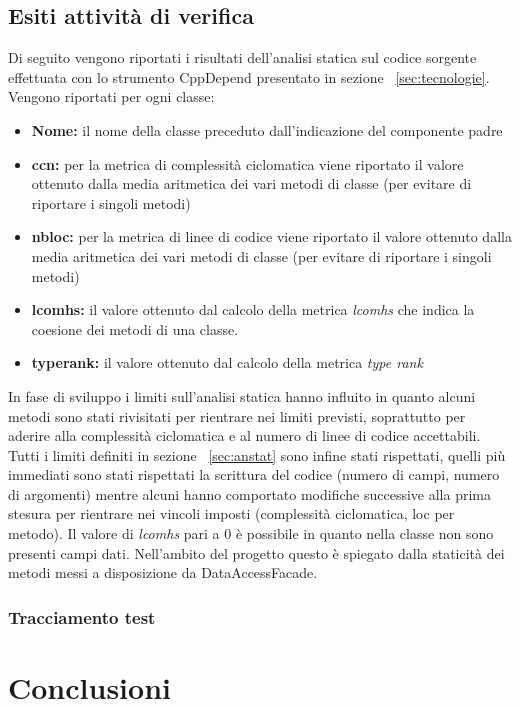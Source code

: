 \documentclass[a4paper,13pt,twoside]{article}
\begin{document}
\subsection{Esiti attività di verifica} \label{sec:esiti}
Di seguito vengono riportati i risultati dell'analisi statica sul codice sorgente effettuata con lo strumento CppDepend presentato in sezione ~\ref{sec:tecnologie}. Vengono riportati per ogni classe:
\begin{itemize}
	\item \textbf{Nome: } il nome della classe preceduto dall'indicazione del componente padre
	\item \textbf{ccn: } per la metrica di complessità ciclomatica viene riportato il valore ottenuto dalla media aritmetica dei vari metodi di classe (per evitare di riportare i singoli metodi)
	\item \textbf{nbloc: } per la metrica di linee di codice viene riportato il valore ottenuto dalla media aritmetica dei vari metodi di classe (per evitare di riportare i singoli metodi)
	\item \textbf{lcomhs: } il valore ottenuto dal calcolo della metrica \textit{lcomhs} che indica la coesione dei metodi di una classe.
	\item \textbf{typerank: } il valore ottenuto dal calcolo della metrica \textit{type rank}
\end{itemize}
In fase di sviluppo i limiti sull'analisi statica hanno influito in quanto alcuni metodi sono stati rivisitati per rientrare nei limiti previsti, soprattutto per aderire alla complessità ciclomatica e al numero di linee di codice accettabili. Tutti i limiti definiti in sezione ~\ref{sec:anstat} sono infine stati rispettati, quelli più immediati sono stati rispettati la scrittura del codice (numero di campi, numero di argomenti) mentre alcuni hanno comportato modifiche successive alla prima stesura per rientrare nei vincoli imposti (complessità ciclomatica, loc per metodo). Il valore di \textit{lcomhs} pari a 0 è possibile in quanto nella classe non sono presenti campi dati. Nell'ambito del progetto questo è spiegato dalla staticità dei metodi messi a disposizione da DataAccessFacade.\\ 


\subsubsection{Tracciamento test}
\newpage
\section{Conclusioni}
\newpage

%
%


%

\appendix
%
%
%
\end{document}
